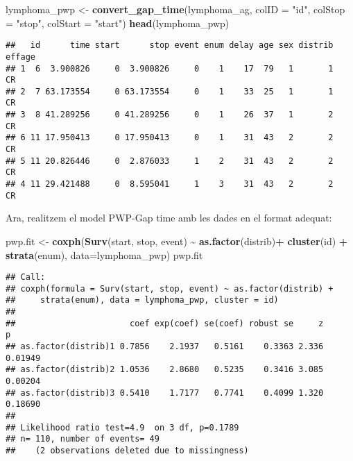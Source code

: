 \documentclass[
]{article}
\newenvironment{Shaded}{\begin{snugshade}}{\end{snugshade}}
\newcommand{\AttributeTok}[1]{\textcolor[rgb]{0.13,0.29,0.53}{#1}}
\newcommand{\FunctionTok}[1]{\textcolor[rgb]{0.13,0.29,0.53}{\textbf{#1}}}
\newcommand{\NormalTok}[1]{#1}
\newcommand{\OtherTok}[1]{\textcolor[rgb]{0.56,0.35,0.01}{#1}}
\newcommand{\SpecialCharTok}[1]{\textcolor[rgb]{0.81,0.36,0.00}{\textbf{#1}}}
\newcommand{\StringTok}[1]{\textcolor[rgb]{0.31,0.60,0.02}{#1}}
\begin{document}
\begin{Shaded}
\begin{Highlighting}[]
\NormalTok{lymphoma\_pwp }\OtherTok{\textless{}{-}} \FunctionTok{convert\_gap\_time}\NormalTok{(lymphoma\_ag, }\AttributeTok{colID =} \StringTok{"id"}\NormalTok{, }\AttributeTok{colStop =} \StringTok{"stop"}\NormalTok{, }\AttributeTok{colStart =} \StringTok{"start"}\NormalTok{)}
\FunctionTok{head}\NormalTok{(lymphoma\_pwp)}
\end{Highlighting}
\end{Shaded}

\begin{verbatim}
##   id      time start      stop event enum delay age sex distrib effage
## 1  6  3.900826     0  3.900826     0    1    17  79   1       1     CR
## 2  7 63.173554     0 63.173554     0    1    33  25   1       1     CR
## 3  8 41.289256     0 41.289256     0    1    26  37   1       2     CR
## 6 11 17.950413     0 17.950413     0    1    31  43   2       2     CR
## 5 11 20.826446     0  2.876033     1    2    31  43   2       2     CR
## 4 11 29.421488     0  8.595041     1    3    31  43   2       2     CR
\end{verbatim}

Ara, realitzem el model PWP-Gap time amb les dades en el format adequat:

\begin{Shaded}
\begin{Highlighting}[]
\NormalTok{pwp.fit }\OtherTok{\textless{}{-}} \FunctionTok{coxph}\NormalTok{(}\FunctionTok{Surv}\NormalTok{(start, stop, event) }\SpecialCharTok{\textasciitilde{}} \FunctionTok{as.factor}\NormalTok{(distrib)}\SpecialCharTok{+}
                  \FunctionTok{cluster}\NormalTok{(id) }\SpecialCharTok{+} \FunctionTok{strata}\NormalTok{(enum), }\AttributeTok{data=}\NormalTok{lymphoma\_pwp)}
\NormalTok{pwp.fit}
\end{Highlighting}
\end{Shaded}

\begin{verbatim}
## Call:
## coxph(formula = Surv(start, stop, event) ~ as.factor(distrib) + 
##     strata(enum), data = lymphoma_pwp, cluster = id)
## 
##                       coef exp(coef) se(coef) robust se     z       p
## as.factor(distrib)1 0.7856    2.1937   0.5161    0.3363 2.336 0.01949
## as.factor(distrib)2 1.0536    2.8680   0.5235    0.3416 3.085 0.00204
## as.factor(distrib)3 0.5410    1.7177   0.7741    0.4099 1.320 0.18690
## 
## Likelihood ratio test=4.9  on 3 df, p=0.1789
## n= 110, number of events= 49 
##    (2 observations deleted due to missingness)
\end{verbatim}
\end{document}
